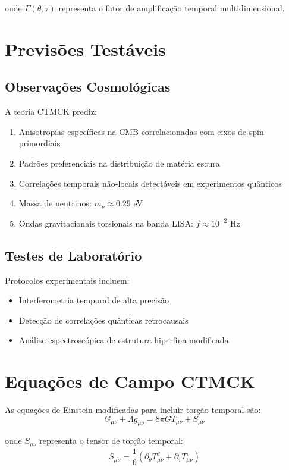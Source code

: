 \documentclass[reprint,amsmath,amssymb,aps,prd]{revtex4-2}
\begin{document}
onde $F(\theta,\tau)$ representa o fator de amplificação temporal multidimensional.

\section{Previsões Testáveis}

\subsection{Observações Cosmológicas}

A teoria CTMCK prediz:
\begin{enumerate}
\item Anisotropias específicas na CMB correlacionadas com eixos de spin primordiais
\item Padrões preferenciais na distribuição de matéria escura
\item Correlações temporais não-locais detectáveis em experimentos quânticos
\item Massa de neutrinos: $m_\nu \approx 0.29$ eV
\item Ondas gravitacionais torsionais na banda LISA: $f \approx 10^{-2}$ Hz
\end{enumerate}

\subsection{Testes de Laboratório}

Protocolos experimentais incluem:
\begin{itemize}
\item Interferometria temporal de alta precisão
\item Detecção de correlações quânticas retrocausais
\item Análise espectroscópica de estrutura hiperfina modificada
\end{itemize}

\section{Equações de Campo CTMCK}

As equações de Einstein modificadas para incluir torção temporal são:
\begin{equation}
G_{\mu\nu} + \Lambda g_{\mu\nu} = 8\pi G T_{\mu\nu} + S_{\mu\nu}
\end{equation}

onde $S_{\mu\nu}$ representa o tensor de torção temporal:
\begin{equation}
S_{\mu\nu} = \frac{1}{6}\left(\partial_\theta T^{\theta}_{\mu\nu} + \partial_\tau T^{\tau}_{\mu\nu}\right)
\end{equation}
\end{document}
